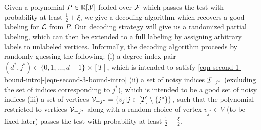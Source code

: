 Given a polynomial $P \in {\ensuremath{\mathbb{R}}}[\mathcal{Y}]$ folded over $\mathcal{F}$ which passes the test with probability at least $\frac12 + \xi$, we give a decoding algorithm which recovers a good labeling for $\mathcal{L}$ from $P$. Our decoding strategy will give us a randomized partial labeling, which can then be extended to a full labeling by assigning arbitrary labels to unlabeled vertices. Informally, the decoding algorithm proceeds by randomly guessing the following: (i) a degree-index pair $(d^*,j^* )\in \{0,1,\ldots,d-1\} \times [T]$, which is intended to satisfy \eqref{eqn-second-1-bound-intro}-\eqref{eqn-second-3-bound-intro} (ii) a set of noisy indices $\mathcal{I}_{-j^*}$ (excluding the set of indices corresponding to $j^*$), which is intended to be a good set of noisy indices  (iii) a set of vertices $\mathcal{V}_{-j^*} = \{v_j | j \in [T]\setminus \{j^*\}\}$, such that the polynomial restricted to vertices $\mathcal{V}_{-j^*}$ along with a random choice of vertex $v_{j^*} \in V$ (to be fixed later) passes the test with probability at least $\frac12 + \frac{\xi}{2}$. 

